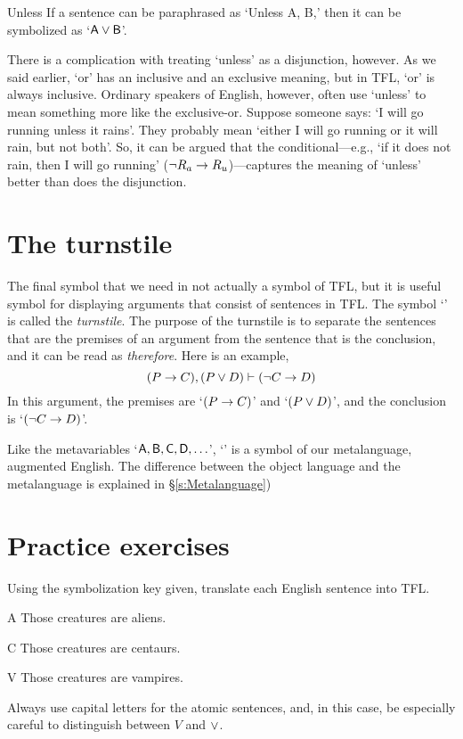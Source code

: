 \begin{factboxy}{Unless}
		If a sentence can be paraphrased as `Unless A, B,' then it can be symbolized as `$\mathsf{A}\vee\mathsf{B}$'.
\end{factboxy}

There is a complication with treating `unless' as a disjunction, however. As we said earlier, `or' has an inclusive and an exclusive meaning, but in TFL, `or' is always inclusive. Ordinary speakers of English, however, often use `unless' to mean something more like the exclusive-or. Suppose someone says: `I will go running unless it rains'. They probably mean `either I will go running or it will rain, but not both'. So, it can be argued that the conditional---e.g., `if it does not rain, then I will go running' (${\neg} R_a \rightarrow R_u$)---captures the meaning of `unless' better than does the disjunction.


\section{The turnstile}

The final symbol that we need in not actually a symbol of TFL, but it is useful symbol for displaying arguments that consist of sentences in TFL. The symbol `\proves' is called the \textit{turnstile}. The purpose of the turnstile is to separate the sentences that are the premises of an argument from the sentence that is the conclusion, and it can be read as \textit{therefore}. Here is an example,
$$(P \rightarrow C), (P \vee D) \vdash ({\neg} C \rightarrow D)$$
In this argument, the premises are `$(P \rightarrow C)$' and `$(P \vee D)$', and the conclusion is `$({\neg} C \rightarrow D)$'.


\begin{notebox}
Like the metavariables `$\mathsf{A}, \mathsf{B}, \mathsf{C}, \mathsf{D}, \ldots$', `\proves' is a symbol of our metalanguage, augmented English. The difference between the object language and the metalanguage is explained in \S\ref{s:Metalanguage})
\end{notebox}



\filbreak
\section{Practice exercises}
\setcounter{ProbPart}{0}

\problempart Using the symbolization key given, translate each English sentence into TFL.\label{pr.monkeysuits}
	\begin{ekey}
		\item[A] Those creatures are aliens. 
		\item[C] Those creatures are centaurs. 
		\item[V] Those creatures are vampires.
	\end{ekey}
Always use capital letters for the atomic sentences, and, in this case, be especially careful to distinguish between $V$ and $\vee$.

